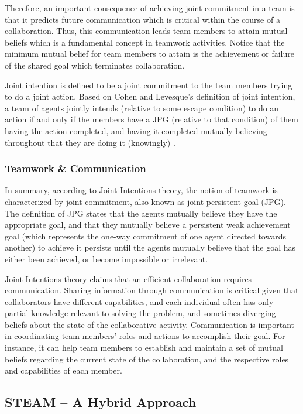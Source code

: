 \documentclass[12pt]{report}
\begin{document}
Therefore, an important consequence of achieving joint commitment in a team is
that it predicts future communication which is critical within the course of a
collaboration. Thus, this communication leads team members to attain mutual
beliefs which is a fundamental concept in teamwork activities. Notice that
the minimum mutual belief for team members to attain is the achievement or
failure of the shared goal which terminates collaboration.

Joint intention is defined to be a joint commitment to the team members trying
to do a joint action. Based on Cohen and Levesque's definition of joint
intention, a team of agents jointly intends (relative to some escape condition)
to do an action if and only if the members have a JPG (relative to that
condition) of them having the action completed, and having it completed
mutually believing throughout that they are doing it (knowingly)
\cite{cohen:teamwork}.

\subsubsection{Teamwork \& Communication}

In summary, according to Joint Intentions theory, the notion of teamwork is
characterized by joint commitment, also known as joint persistent goal (JPG).
The definition of JPG states that the agents mutually believe they have the
appropriate goal, and that they mutually believe a persistent weak achievement
goal (which represents the one-way commitment of one agent directed towards
another) to achieve it persists until the agents mutually believe that the goal
has either been achieved, or become impossible or irrelevant. 

Joint Intentions theory claims that an efficient collaboration requires
communication. Sharing information through communication is critical given that
collaborators have different capabilities, and each individual often has only
partial knowledge relevant to solving the problem, and sometimes diverging
beliefs about the state of the collaborative activity. Communication is
important in coordinating team members' roles and actions to accomplish their
goal. For instance, it can help team members to establish and maintain a set of
mutual beliefs regarding the current state of the collaboration, and the
respective roles and capabilities of each member.

\subsection{STEAM -- A Hybrid Approach}
\end{document}

